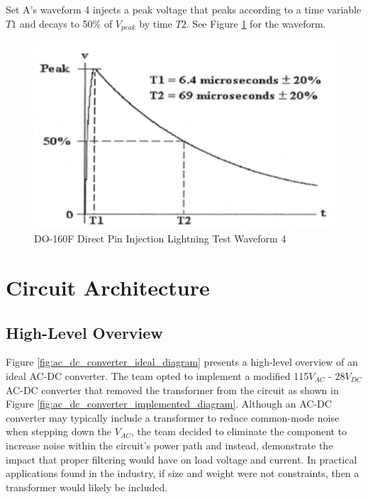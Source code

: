 \documentclass[conference]{IEEEtran}
\begin{document}
Set A's waveform 4 injects a peak voltage that peaks according to a time variable ${T1}$ and decays to 50\% of $V_{peak}$ by time ${T2}$. See Figure \ref{fig:do-160f_waveform_set_4_diagram} for the waveform.

\begin{figure}[hp]
    \centering
    \includegraphics[width=1.0\linewidth]{do-160f_waveform_set_4.png}
    \caption{DO-160F Direct Pin Injection Lightning Test Waveform 4}
    \label{fig:do-160f_waveform_set_4_diagram}
\end{figure}

\section{Circuit Architecture}

\subsection{High-Level Overview}

Figure \ref{fig:ac_dc_converter_ideal_diagram} presents a high-level overview of an ideal AC-DC converter. The team opted to implement a modified 115$V_{AC}$ - 28$V_{DC}$ AC-DC converter that removed the transformer from the circuit as shown in Figure \ref{fig:ac_dc_converter_implemented_diagram}. Although an AC-DC converter may typically include a transformer to reduce common-mode noise when stepping down the $V_{AC}$, the team decided to eliminate the component to increase noise within the circuit's power path and instead, demonstrate the impact that proper filtering would have on load voltage and current. In practical applications found in the industry, if size and weight were not constraints, then a transformer would likely be included.
\end{document}
